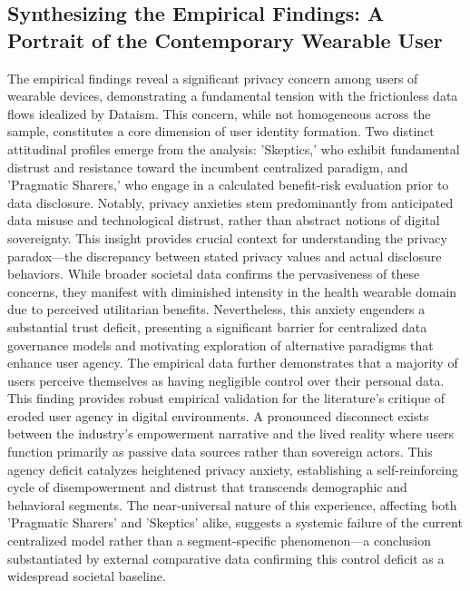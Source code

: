 \subsection{Synthesizing the Empirical Findings: A Portrait of the Contemporary Wearable User}
	The empirical findings reveal a significant privacy concern among users of wearable devices, demonstrating a fundamental tension with the frictionless data flows idealized by Dataism. This concern, while not homogeneous across the sample, constitutes a core dimension of user identity formation. Two distinct attitudinal profiles emerge from the analysis: 'Skeptics,' who exhibit fundamental distrust and resistance toward the incumbent centralized paradigm, and 'Pragmatic Sharers,' who engage in a calculated benefit-risk evaluation prior to data disclosure. Notably, privacy anxieties stem predominantly from anticipated data misuse and technological distrust, rather than abstract notions of digital sovereignty. This insight provides crucial context for understanding the privacy paradox—the discrepancy between stated privacy values and actual disclosure behaviors. While broader societal data confirms the pervasiveness of these concerns, they manifest with diminished intensity in the health wearable domain due to perceived utilitarian benefits. Nevertheless, this anxiety engenders a substantial trust deficit, presenting a significant barrier for centralized data governance models and motivating exploration of alternative paradigms that enhance user agency.
	The empirical data further demonstrates that a majority of users perceive themselves as having negligible control over their personal data. This finding provides robust empirical validation for the literature's critique of eroded user agency in digital environments. A pronounced disconnect exists between the industry's empowerment narrative and the lived reality where users function primarily as passive data sources rather than sovereign actors. This agency deficit catalyzes heightened privacy anxiety, establishing a self-reinforcing cycle of disempowerment and distrust that transcends demographic and behavioral segments. The near-universal nature of this experience, affecting both 'Pragmatic Sharers' and 'Skeptics' alike, suggests a systemic failure of the current centralized model rather than a segment-specific phenomenon—a conclusion substantiated by external comparative data confirming this control deficit as a widespread societal baseline.
